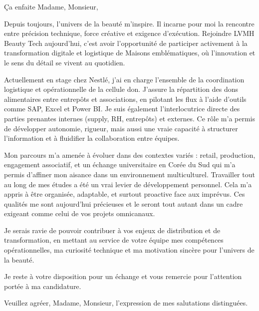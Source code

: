 
Ça enfaite Madame, Monsieur,

Depuis toujours, l’univers de la beauté m’inspire. Il incarne pour moi la rencontre entre précision technique, force créative et exigence d’exécution. Rejoindre LVMH Beauty Tech aujourd’hui, c’est avoir l’opportunité de participer activement à la transformation digitale et logistique de Maisons emblématiques, où l’innovation et le sens du détail se vivent au quotidien.

Actuellement en stage chez Nestlé, j’ai en charge l’ensemble de la coordination logistique et opérationnelle de la cellule don. J’assure la répartition des dons alimentaires entre entrepôts et associations, en pilotant les flux à l’aide d’outils comme SAP, Excel et Power BI. Je suis également l’interlocutrice directe des parties prenantes internes (supply, RH, entrepôts) et externes. Ce rôle m’a permis de développer autonomie, rigueur, mais aussi une vraie capacité à structurer l’information et à fluidifier la collaboration entre équipes.

Mon parcours m’a amenée à évoluer dans des contextes variés : retail, production, engagement associatif, et un échange universitaire en Corée du Sud qui m’a permis d’affiner mon aisance dans un environnement multiculturel. Travailler tout au long de mes études a été un vrai levier de développement personnel. Cela m’a appris à être organisée, adaptable, et surtout proactive face aux imprévus. Ces qualités me sont aujourd’hui précieuses et le seront tout autant dans un cadre exigeant comme celui de vos projets omnicanaux.

Je serais ravie de pouvoir contribuer à vos enjeux de distribution et de transformation, en mettant au service de votre équipe mes compétences opérationnelles, ma curiosité technique et ma motivation sincère pour l’univers de la beauté.

Je reste à votre disposition pour un échange et vous remercie pour l’attention portée à ma candidature.

Veuillez agréer, Madame, Monsieur, l’expression de mes salutations distinguées.

